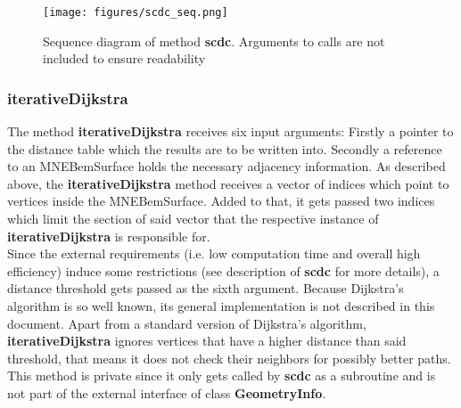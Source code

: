 \clearpage

\begin{figure}[h]
	\begin{center}
		\texttt{[image: figures/scdc\_seq.png]}
		\caption{Sequence diagram of method \textbf{scdc}. Arguments to calls are not included to ensure readability}
	\end{center}
\end{figure}

\subsubsection{iterativeDijkstra}
The method \textbf{iterativeDijkstra} receives six input arguments: Firstly a pointer to the distance table which the results are to be written into. Secondly a reference to an MNEBemSurface holds the necessary adjacency information. As described above, the \textbf{iterativeDijkstra} method receives a vector of indices which point to vertices inside the MNEBemSurface. Added to that, it gets passed two indices which limit the section of said vector that the respective instance of \textbf{iterativeDijkstra} is responsible for.\\
Since the external requirements (i.e. low computation time and overall high efficiency) induce some restrictions (see description of \textbf{scdc} for more details), a distance threshold gets passed as the sixth argument. Because Dijkstra's algorithm is so well known, its general implementation is not described in this document. Apart from a standard version of Dijkstra's algorithm, \textbf{iterativeDijkstra} ignores vertices that have a higher distance than said threshold, that means it does not check their neighbors for possibly better paths.\\
This method is private since it only gets called by \textbf{scdc} as a subroutine and is not part of the external interface of class \textbf{GeometryInfo}.

